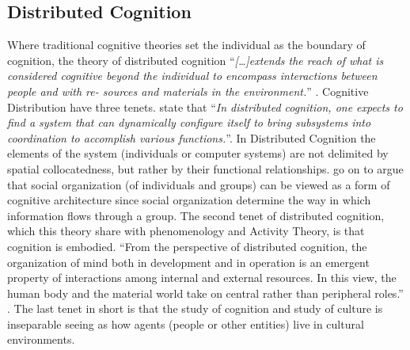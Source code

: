 \subsection{Distributed Cognition}

Where traditional cognitive theories set the individual as the boundary of cognition, the theory of distributed cognition ``\textit{[\dots]extends the reach of what is considered cognitive beyond the individual to encompass interactions between people and with re- sources and materials in the environment.}'' \parencite[][175]{Hollan2000distributedcognition}. Cognitive Distribution have three tenets. \textcite[][175]{Hollan2000distributedcognition} state that ``\textit{In distributed cognition, one expects to find a system that can dynamically configure itself to bring subsystems into coordination to accomplish various functions.}''. In Distributed Cognition the elements of the system (individuals or computer systems) are not delimited by spatial collocatedness, but rather by their functional relationships. \textcite{Hollan2000distributedcognition} go on to argue that social organization (of individuals and groups) can be viewed as a form of cognitive architecture since social organization determine the way in which information flows through a group. The second tenet of distributed cognition, which this theory share with phenomenology and Activity Theory, is that cognition is embodied. ``From the perspective of distributed cognition, the organization of mind both in development and in operation is an emergent property of interactions among internal and external resources. In this view, the human body and the material world take on central rather than peripheral roles.'' \parencite[][178]{Hollan2000distributedcognition}. The last tenet in short is that the study of cognition and study of culture is inseparable seeing as how agents (people or other entities) live in cultural environments.

